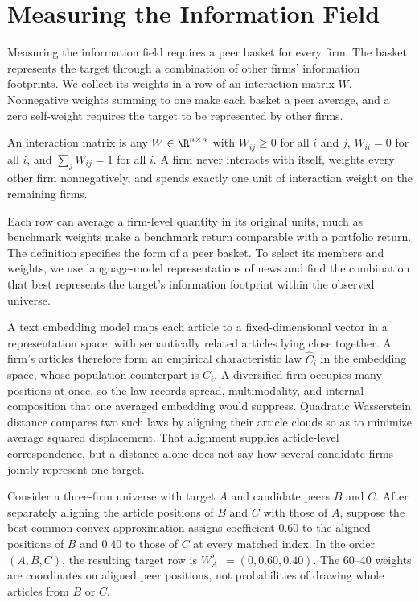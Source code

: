 \section{Measuring the Information Field}
\label{sec:interaction-operator}

Measuring the information field requires a peer basket for every firm.
The basket represents the target through a combination of other firms'
information footprints.
We collect its weights in a row of an interaction matrix $W$.
Nonnegative weights summing to one make each basket a peer average, and a zero
self-weight requires the target to be represented by other firms.

\begin{definition}\label{def:interaction-matrix}
  An interaction matrix is any $W \in \R^{n \times n}$ with $W_{ij} \geq 0$ for
  all $i$ and $j$, $W_{ii} = 0$ for all $i$, and $\sum_j W_{ij} = 1$ for all
  $i$.
  A firm never interacts with itself, weights every other firm nonnegatively,
  and spends exactly one unit of interaction weight on the remaining firms.
\end{definition}

Each row can average a firm-level quantity in its original units, much as
benchmark weights make a benchmark return comparable with a portfolio return.
The definition specifies the form of a peer basket.
To select its members and weights, we use language-model representations of
news and find the combination that best represents the target's information
footprint within the observed universe.

A text embedding model maps each article to a fixed-dimensional vector in a
representation space, with semantically related articles lying close together.
A firm's articles therefore form an empirical characteristic law
$\widehat C_i$ in the embedding space, whose population counterpart is $C_i$.
A diversified firm occupies many positions at once, so the law records spread,
multimodality, and internal composition that one averaged embedding would
suppress.
Quadratic Wasserstein distance compares two such laws by aligning their
article clouds so as to minimize average squared displacement.
That alignment supplies article-level correspondence, but a distance alone
does not say how several candidate firms jointly represent one target.

Consider a three-firm universe with target $A$ and candidate peers $B$ and $C$.
After separately aligning the article positions of $B$ and $C$ with those of
$A$, suppose the best common convex approximation assigns coefficient $0.60$ to
the aligned positions of $B$ and $0.40$ to those of $C$ at every matched index.
In the order $(A,B,C)$, the resulting target row is
$W^\flat_{A\cdot}=(0,0.60,0.40)$.
The 60--40 weights are coordinates on aligned peer positions, not probabilities
of drawing whole articles from $B$ or $C$.

